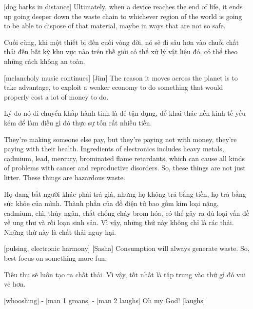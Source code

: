 \documentclass[a4paper]{article}
\begin{document}
	[dog barks in distance]
	Ultimately, when a device reaches the end of life, it ends up going deeper down the waste chain to whichever region of the world is going to be able to dispose of that material, maybe in ways that are not so safe.
	
	\begin{vietnamese-v2}
		Cuối cùng, khi một thiết bị đến cuối vòng đời, nó sẽ đi sâu hơn vào chuỗi chất thải đến bất kỳ khu vực nào trên thế giới có thể xử lý vật liệu đó, có thể theo những cách không an toàn.
	\end{vietnamese-v2}
	
	[melancholy music continues]
	[Jim] The reason it moves across the planet is to take advantage, to exploit a weaker economy to do something that would properly cost a lot of money to do.
	
	\begin{vietnamese-v2}
		 Lý do nó di chuyển khắp hành tinh là để tận dụng, để khai thác nền kinh tế yếu kém để làm điều gì đó thực sự tốn rất nhiều tiền.
	\end{vietnamese-v2}
	
	They're making someone else pay, but they're paying not with money, they're paying with their health.
	Ingredients of electronics includes heavy metals, cadmium, lead, mercury, brominated flame retardants, which can cause all kinds of problems with cancer and reproductive disorders.
	So, these things are not just litter. These things are hazardous waste.
	
	\begin{vietnamese-v2}
		Họ đang bắt người khác phải trả giá, nhưng họ không trả bằng tiền, họ trả bằng sức khỏe của mình.
		Thành phần của đồ điện tử bao gồm kim loại nặng, cadmium, chì, thủy ngân, chất chống cháy brom hóa, có thể gây ra đủ loại vấn đề về ung thư và rối loạn sinh sản.
		Vì vậy, những thứ này không chỉ là rác thải. Những thứ này là chất thải nguy hại.
	\end{vietnamese-v2}
	
	[pulsing, electronic harmony]
	[Sasha] Consumption will always generate waste.
	So, best focus on something more fun.
	
	\begin{vietnamese-v2}
		 Tiêu thụ sẽ luôn tạo ra chất thải.
		Vì vậy, tốt nhất là tập trung vào thứ gì đó vui vẻ hơn.
	\end{vietnamese-v2}
	
	[whooshing]
	- [man 1 groans] - [man 2 laughs]
	Oh my God! [laughs]
	
\end{document}
